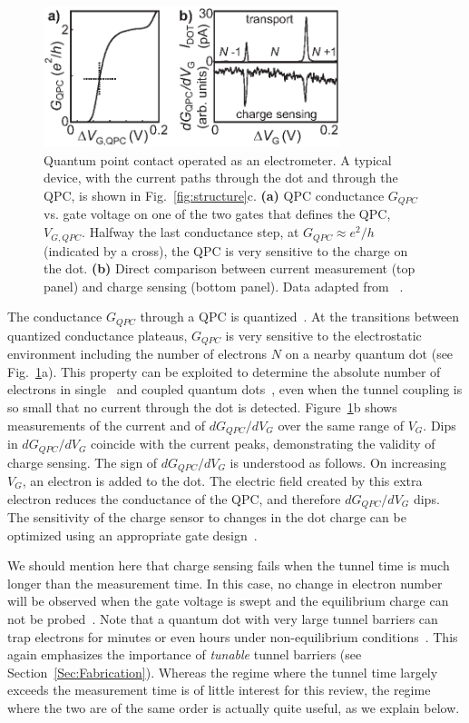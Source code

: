 \documentclass[12pt,aps,nofootinbib]{revtex4-1}
\begin{document}
\begin{figure}[htb]
\includegraphics[width=3.4in]{hanson_fig11.eps}
\caption{Quantum point contact operated as an electrometer. A typical device, with the current paths through the dot and through the QPC, is shown in Fig.~\ref{fig:structure}c.
\textbf{(a)} QPC conductance $G_{QPC}$ vs. gate voltage on one of
the two gates that defines the QPC, $V_{G,QPC}$. Halfway the last
conductance step, at $G_{QPC}\approx e^2/h$ (indicated by a
cross), the QPC is very sensitive to the charge on the dot.
\textbf{(b)} Direct comparison between current measurement (top
panel) and charge sensing (bottom panel). Data adapted from
~\textcite{ElzermanPRB2003}.} \label{fig:chargesensing}
\end{figure}

The conductance $G_{QPC}$ through a QPC is
quantized~\cite{WeesQPC88,WharamQPC88}. At the transitions between
quantized conductance plateaus, $G_{QPC}$ is very sensitive to the
electrostatic environment including the number of electrons $N$ on
a nearby quantum dot (see Fig.~\ref{fig:chargesensing}a). This
property can be exploited to determine the absolute number of
electrons in single~\cite{Sprinzak2002} and coupled quantum
dots~\cite{ElzermanPRB2003}, even when the tunnel coupling is so
small that no current through the dot is detected.
Figure~\ref{fig:chargesensing}b shows measurements of the current
and of $dG_{QPC}/dV_{G}$ over the same range of $V_{G}$. Dips in
$dG_{QPC}/dV_{G}$ coincide with the current peaks, demonstrating
the validity of charge sensing. The sign of $dG_{QPC}/dV_{G}$ is
understood as follows. On increasing $V_G$, an electron is added
to the dot. The electric field created by this extra electron
reduces the conductance of the QPC, and therefore
$dG_{QPC}/dV_{G}$ dips. The sensitivity of the charge sensor to
changes in the dot charge can be optimized using an appropriate
gate design~\cite{zhang04}.

We should mention here that charge sensing fails when the tunnel time is much longer than the measurement time. In this case, no change in electron number will be observed when the gate voltage is swept and the equilibrium charge can not be probed~\cite{RushforthPRB2004}. Note that a quantum dot with very large tunnel barriers can trap electrons for minutes or even hours under non-equilibrium conditions~\cite{CooperPhysE2000}. This again emphasizes the importance of \textit{tunable} tunnel barriers (see Section~\ref{Sec:Fabrication}). Whereas the regime where the tunnel time largely exceeds the measurement time is of little interest for this review, the regime where the two are of the same order is actually quite useful, as we explain below.
\end{document}

